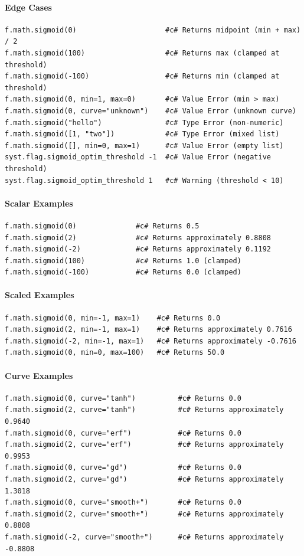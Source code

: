 \paragraph{Edge Cases}
\begin{verbatim}
f.math.sigmoid(0)                     #c# Returns midpoint (min + max) / 2
f.math.sigmoid(100)                   #c# Returns max (clamped at threshold)
f.math.sigmoid(-100)                  #c# Returns min (clamped at threshold)
f.math.sigmoid(0, min=1, max=0)       #c# Value Error (min > max)
f.math.sigmoid(0, curve="unknown")    #c# Value Error (unknown curve)
f.math.sigmoid("hello")               #c# Type Error (non-numeric)
f.math.sigmoid([1, "two"])            #c# Type Error (mixed list)
f.math.sigmoid([], min=0, max=1)      #c# Value Error (empty list)
syst.flag.sigmoid_optim_threshold -1  #c# Value Error (negative threshold)
syst.flag.sigmoid_optim_threshold 1   #c# Warning (threshold < 10)
\end{verbatim}

\paragraph{Scalar Examples}
\begin{verbatim}
f.math.sigmoid(0)              #c# Returns 0.5
f.math.sigmoid(2)              #c# Returns approximately 0.8808
f.math.sigmoid(-2)             #c# Returns approximately 0.1192
f.math.sigmoid(100)            #c# Returns 1.0 (clamped)
f.math.sigmoid(-100)           #c# Returns 0.0 (clamped)
\end{verbatim}

\paragraph{Scaled Examples}
\begin{verbatim}
f.math.sigmoid(0, min=-1, max=1)    #c# Returns 0.0
f.math.sigmoid(2, min=-1, max=1)    #c# Returns approximately 0.7616
f.math.sigmoid(-2, min=-1, max=1)   #c# Returns approximately -0.7616
f.math.sigmoid(0, min=0, max=100)   #c# Returns 50.0
\end{verbatim}

\paragraph{Curve Examples}
\begin{verbatim}
f.math.sigmoid(0, curve="tanh")          #c# Returns 0.0
f.math.sigmoid(2, curve="tanh")          #c# Returns approximately 0.9640
f.math.sigmoid(0, curve="erf")           #c# Returns 0.0
f.math.sigmoid(2, curve="erf")           #c# Returns approximately 0.9953
f.math.sigmoid(0, curve="gd")            #c# Returns 0.0
f.math.sigmoid(2, curve="gd")            #c# Returns approximately 1.3018
f.math.sigmoid(0, curve="smooth+")       #c# Returns 0.0
f.math.sigmoid(2, curve="smooth+")       #c# Returns approximately 0.8808
f.math.sigmoid(-2, curve="smooth+")      #c# Returns approximately -0.8808
\end{verbatim}

